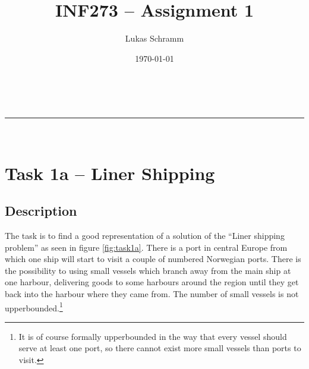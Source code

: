 \documentclass[a4paper,10pt]{article}
\makeatletter
\newcommand{\linia}{\rule{\linewidth}{0.5pt}}
\theoremstyle{mytheor}
\renewcommand{\maketitle}{
\begin{center}
\vspace{2ex}
{\huge \textsc{\@title}}
\vspace{1ex}
\\
\linia\\
\@author \hfill \@date
\vspace{4ex}
\end{center}
}
\makeatother
\begin{document}
\title{INF273 – Assignment 1}

\author{Lukas Schramm}

\date{\today}

\maketitle

\section*{Task 1a – Liner Shipping}
\subsection*{Description}
The task is to find a good representation of a solution of the \enquote{Liner shipping problem} as seen in figure \ref{fig:task1a}. There is a port in central Europe from which one ship will start to visit a couple of numbered Norwegian ports. There is the possibility to using small vessels which branch away from the main ship at one harbour, delivering goods to some harbours around the region until they get back into the harbour where they came from. The number of small vessels is not upperbounded.\footnote{It is of course formally upperbounded in the way that every vessel should serve at least one port, so there cannot exist more small vessels than ports to visit.}\medskip
\end{document}
